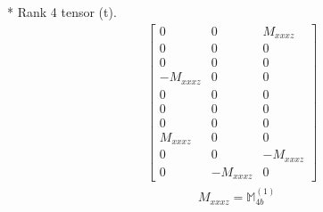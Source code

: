 \documentclass[fleqn,8pt,landscape]{jsarticle}
\begin{document}
* Rank 4 tensor (t).
\begin{align*}
\begin{bmatrix} 0 & 0 & M_{xxxz} \\ 0 & 0 & 0 \\ 0 & 0 & 0 \\ - M_{xxxz} & 0 & 0 \\ 0 & 0 & 0 \\ 0 & 0 & 0 \\ 0 & 0 & 0 \\ M_{xxxz} & 0 & 0 \\ 0 & 0 & - M_{xxxz} \\ 0 & - M_{xxxz} & 0 \end{bmatrix}
\end{align*}
\begin{align*}
& M_{xxxz} = \mathbb{M}_{4b}^{(1)}
\end{align*}
\end{document}
